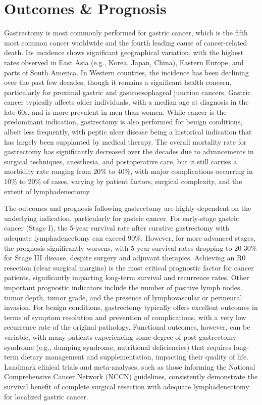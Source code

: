 \section*{Outcomes \& Prognosis}
Gastrectomy is most commonly performed for gastric cancer, which is the fifth most common cancer worldwide and the fourth leading cause of cancer-related death. Its incidence shows significant geographical variation, with the highest rates observed in East Asia (e.g., Korea, Japan, China), Eastern Europe, and parts of South America. In Western countries, the incidence has been declining over the past few decades, though it remains a significant health concern, particularly for proximal gastric and gastroesophageal junction cancers. Gastric cancer typically affects older individuals, with a median age at diagnosis in the late 60s, and is more prevalent in men than women. While cancer is the predominant indication, gastrectomy is also performed for benign conditions, albeit less frequently, with peptic ulcer disease being a historical indication that has largely been supplanted by medical therapy. The overall mortality rate for gastrectomy has significantly decreased over the decades due to advancements in surgical techniques, anesthesia, and postoperative care, but it still carries a morbidity rate ranging from 20\% to 40\%, with major complications occurring in 10\% to 20\% of cases, varying by patient factors, surgical complexity, and the extent of lymphadenectomy.

The outcomes and prognosis following gastrectomy are highly dependent on the underlying indication, particularly for gastric cancer. For early-stage gastric cancer (Stage I), the 5-year survival rate after curative gastrectomy with adequate lymphadenectomy can exceed 90\%. However, for more advanced stages, the prognosis significantly worsens, with 5-year survival rates dropping to 20-30\% for Stage III disease, despite surgery and adjuvant therapies. Achieving an R0 resection (clear surgical margins) is the most critical prognostic factor for cancer patients, significantly impacting long-term survival and recurrence rates. Other important prognostic indicators include the number of positive lymph nodes, tumor depth, tumor grade, and the presence of lymphovascular or perineural invasion. For benign conditions, gastrectomy typically offers excellent outcomes in terms of symptom resolution and prevention of complications, with a very low recurrence rate of the original pathology. Functional outcomes, however, can be variable, with many patients experiencing some degree of post-gastrectomy syndrome (e.g., dumping syndrome, nutritional deficiencies) that requires long-term dietary management and supplementation, impacting their quality of life. Landmark clinical trials and meta-analyses, such as those informing the National Comprehensive Cancer Network (NCCN) guidelines, consistently demonstrate the survival benefit of complete surgical resection with adequate lymphadenectomy for localized gastric cancer.

